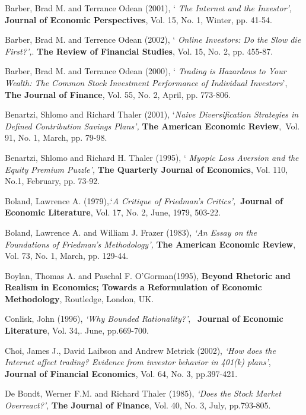 \documentclass{ucthesis}
\begin{document}
\begin{thebibliography}{99}
 Barber, Brad M. and Terrance Odean (2001), `\textit{%
The Internet and the Investor',} \textbf{Journal of Economic Perspectives},
Vol. 15, No. 1, Winter, pp. 41-54.

 Barber, Brad M. and Terrence Odean (2002), `\textit{%
Online Investors: Do the Slow die First?',}. \textbf{The Review of Financial
Studies}, Vol. 15, No. 2, pp. 455-87.

 Barber, Brad M. and Terrance Odean (2000), `\textit{%
Trading is Hazardous to Your Wealth: The Common Stock Investment Performance
of Individual Investors}', \textbf{The Journal of Finance}, Vol. 55, No. 2,
April, pp. 773-806.

 Benartzi, Shlomo and Richard Thaler (2001), `\textit{Naive
Diversification Strategies in Defined Contribution Savings Plans', }\textbf{%
The American Economic Review},\ Vol. 91, No. 1, March, pp. 79-98.

 Benartzi, Shlomo and Richard H. Thaler (1995), `\textit{%
Myopic Loss Aversion and the Equity Premium Puzzle',} \textbf{The Quarterly
Journal of Economics}, Vol. 110, No.1, February, pp. 73-92.

 Boland, Lawrence A. (1979),.`\textit{A Critique of
Friedman's Critics',}\textbf{\ Journal of Economic Literature}, Vol. 17, No.
2, June, 1979, 503-22.

 Boland, Lawrence A. and William J. Frazer (1983), 
\textit{`An Essay on the Foundations of Friedman's Methodology', }\textbf{%
The American Economic Review}, Vol. 73, No. 1, March, pp. 129-44.

 Boylan, Thomas A. and Paschal F. O'Gorman(1995), \textbf{%
Beyond Rhetoric and Realism in Economics; Towards a Reformulation of
Economic Methodology}, Routledge, London, UK.

 Conlisk, John (1996), \textit{`Why Bounded Rationality?'},%
\textit{\ }\textbf{Journal of Economic Literature}, Vol. 34,. June,
pp.669-700.

 Choi, James J., David Laibson and Andrew Metrick (2002), 
\textit{`How does the Internet affect trading? Evidence from investor
behavior in 401(k) plans'}, \textbf{Journal of Financial Economics}, Vol.
64, No. 3, pp.397-421.

 De Bondt, Werner F.M. and Richard Thaler (1985), \textit{%
`Does the Stock Market Overreact?'}, \textbf{The Journal of Finance}, Vol.
40, No. 3, July, pp.793-805.


\end{thebibliography}
\end{document}
